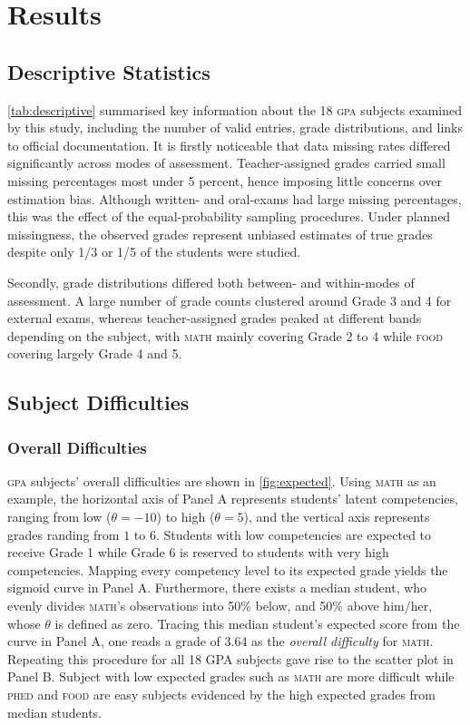 \section{Results}

\subsection{Descriptive Statistics}

\cref{tab:descriptive} summarised key information about the 18 \textsc{gpa} subjects examined by this study, including the number of valid entries, grade distributions, and links to official documentation. It is firstly noticeable that data missing rates differed significantly across modes of assessment. Teacher-assigned grades carried small missing percentages most under 5 percent, hence imposing little concerns over estimation bias. Although written- and oral-exams had large missing percentages, this was the effect of the equal-probability sampling procedures. Under planned missingness, the observed grades represent unbiased estimates of true grades despite only 1/3 or 1/5 of the students were studied.

Secondly, grade distributions differed both between- and within-modes of assessment. A large number of grade counts clustered around Grade 3 and 4 for external exams, whereas teacher-assigned grades peaked at different bands depending on the subject, with \textsc{math} mainly covering Grade 2 to 4 while \textsc{food} covering largely Grade 4 and 5.

\subsection{Subject Difficulties}

\subsubsection{Overall Difficulties}
\textsc{gpa} subjects' overall difficulties are shown in \cref{fig:expected}. Using \textsc{math} as an example, the horizontal axis of Panel A represents students' latent competencies, ranging from low ($\theta=-10$) to high ($\theta=5$), and the vertical axis represents grades randing from $1$ to $6$. Students with low competencies are expected to receive Grade 1 while Grade 6 is reserved to students with very high competencies. Mapping every competency level to its expected grade yields the sigmoid curve in Panel A. Furthermore, there exists a median student, who evenly divides \textsc{math}'s observations into 50\% below, and 50\% above him/her, whose $\theta$ is defined as zero. Tracing this median student's expected score from the curve in Panel A, one reads a grade of 3.64 as the \emph{overall difficulty} for \textsc{math}. Repeating this procedure for all 18 GPA subjects gave rise to the scatter plot in Panel B. Subject with low expected grades such as \textsc{math} are more difficult while \textsc{phed} and \textsc{food} are easy subjects evidenced by the high expected grades from median students.

